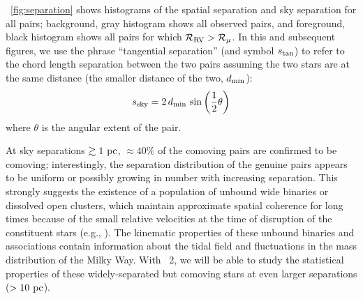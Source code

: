 \documentclass[modern, letterpaper]{aastex61}
\newcommand{\gaia}{\project{Gaia}}
\newcommand{\DR}[1]{\acronym{DR}#1}
\newcommand{\llrold}{\ensuremath{\mathcal{R}_\mu}}
\newcommand{\llrnew}{\ensuremath{\mathcal{R}_{\rm RV}}}
\begin{document}
\figurename~\ref{fig:separation} shows histograms of the spatial separation and
sky separation for all pairs; background, gray histogram shows all observed
pairs, and foreground, black histogram shows all pairs for which $\llrnew >
\llrold$.
In this and subsequent figures, we use the phrase ``tangential separation'' (and
symbol $s_{\rm tan}$) to refer to the chord length separation between the two
pairs assuming the two stars are at the same distance (the smaller distance of
the two, $d_{\rm min}$):
\begin{equation}
    s_{\rm sky} = 2\, d_{\rm min} \, \sin{\left( \frac{1}{2}\theta \right)}
\end{equation}
where $\theta$ is the angular extent of the pair.

At sky separations $\gtrsim 1~\mathrm{pc}$, $\approx 40\%$ of the comoving pairs are
confirmed to be comoving; interestingly, the separation distribution of the
genuine pairs appears to be uniform or possibly growing in number with
increasing separation.
This strongly suggests the existence of a population of unbound wide binaries or
dissolved open clusters, which maintain approximate spatial coherence for long
times because of the small relative velocities at the time of disruption of the
constituent stars (e.g., \citealt{Jiang:2010}).
The kinematic properties of these unbound binaries and associations contain
information about the tidal field and fluctuations in the mass distribution of
the Milky Way.
With \gaia\ \DR{2}, we will be able to study the statistical properties of these
widely-separated but comoving stars at even larger separations ($>10~\mathrm{pc}$).
\end{document}
